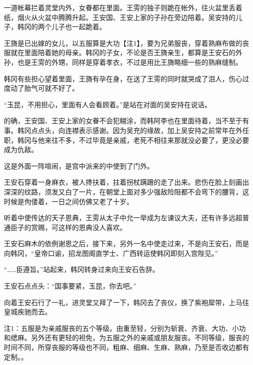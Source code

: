 一道帐幕拦着灵堂内外，女眷都在里面。王雱的独子则跪在帐外，往火盆里丢着纸，烟火从火盆中腾腾升起。王安国、王安上家的子孙在旁边陪着。吴安持的儿子，韩冈的两个儿子也一起跪着。

王旖是已出嫁的女儿，以五服算是大功【注1】，要为兄弟服丧，穿着熟麻布做的丧服就在里面陪着她的母亲。韩冈的子女，不论是否王旖亲生，都算是王安石的外孙，也是王雱的外甥，同样是穿着孝衣，不过是用比王旖略细一些的熟麻缝制。

韩冈有些担心望着里面，王旖有孕在身，在送了王雱的同时就哭成了泪人，伤心过度动了胎气可就不好了。

“玉昆，不用担心，里面有人会看顾着。”是站在对面的吴安持在说话。

的确，王安国、王安上家的女眷不会犯糊涂，而韩阿李也在里面待着，当不至于有事。韩冈点点头，向连襟表示感谢。因为吴充的缘故，加上吴安持之前常年在外任职，韩冈与他来往不多，不过毕竟是亲戚，老死不相往来那就没必要了，更没必要成为仇敌。

这是外面一阵喧闹，是宫中派来的中使到了门外。

王安石穿着一身麻衣，被人搀扶着，拄着拐杖蹒跚的走了出来。悲伤在脸上刻画出深深的纹路，须发又白了一片，在朝堂上面对多少强敌险阻都不会弯下的腰背，这时候是佝偻着，一日之间仿佛又老了十岁。

听着中使传达的天子恩典，王雱从太子中允一举成为左谏议大夫，还有许多远超普通臣子的赏赐，可这样的恩典没人喜欢。

王安石麻木的依例谢恩之后，接下来，另外一名中使走过来，不是向王安石，而是向韩冈，“皇帝口谕，招龙图阁直学士、广西转运使韩冈即刻入宫陛见。”

“……臣遵旨。”站起来，韩冈转身过来向王安石告辞。

王安石点点头：“国事要紧，玉昆，你去吧。”

向着王安石行了一礼，进灵堂又拜了一下，韩冈去了丧仪，换了紫袍犀带，上马往皇城疾驰而去。

注1：五服是为亲戚服丧的五个等级。由重至轻，分别为斩衰、齐衰、大功、小功和缌麻。另外还有更轻的袒免，为五服之外的亲戚或朋友服丧。不同等级，服丧的时间不同，所穿丧服的等级也不同，粗麻、细麻、生麻、熟麻，乃至是否收边都有定制。。

